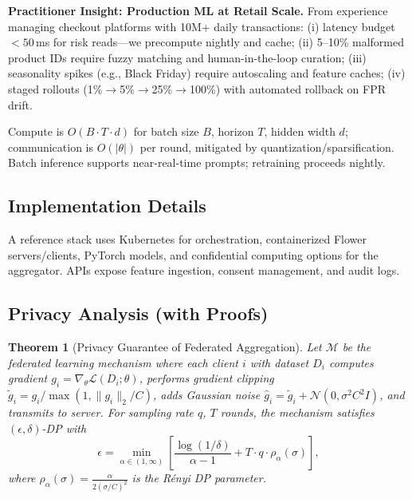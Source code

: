 \documentclass[conference]{IEEEtran}
\theoremstyle{plain}
\newtheorem{theorem}{Theorem}
\theoremstyle{remark}
\begin{document}
\begin{mdframed}
\textbf{Practitioner Insight: Production ML at Retail Scale.} From experience managing checkout platforms with 10M+ daily transactions: (i) latency budget $<50$\,ms for risk reads---we precompute nightly and cache; (ii) 5--10\% malformed product IDs require fuzzy matching and human-in-the-loop curation; (iii) seasonality spikes (e.g., Black Friday) require autoscaling and feature caches; (iv) staged rollouts (1\%$\rightarrow$5\%$\rightarrow$25\%$\rightarrow$100\%) with automated rollback on FPR drift.
\end{mdframed}

Compute is $O(B\cdot T \cdot d)$ for batch size $B$, horizon $T$, hidden width $d$; communication is $O(|\theta|)$ per round, mitigated by quantization/sparsification. Batch inference supports near-real-time prompts; retraining proceeds nightly.

\subsection{Implementation Details}
A reference stack uses Kubernetes for orchestration, containerized Flower servers/clients, PyTorch models, and confidential computing options for the aggregator. APIs expose feature ingestion, consent management, and audit logs.

\subsection{Privacy Analysis (with Proofs)}\label{sec:privacy-analysis}
\begin{theorem}[Privacy Guarantee of Federated Aggregation]\label{thm:dp}
Let $\mathcal{M}$ be the federated learning mechanism where each client $i$ with dataset $D_i$ computes gradient $g_i = \nabla_\theta \mathcal{L}(D_i; \theta)$, performs gradient clipping $\tilde{g}_i = g_i / \max(1, \|g_i\|_2 / C)$, adds Gaussian noise $\hat{g}_i = \tilde{g}_i + \mathcal{N}(0, \sigma^2 C^2 I)$, and transmits to server. For sampling rate $q$, $T$ rounds, the mechanism satisfies $(\epsilon, \delta)$-DP with
\begin{equation*}
\epsilon = \min_{\alpha \in (1,\infty)} \left[ \frac{\log(1/\delta)}{\alpha - 1} + T \cdot q \cdot \rho_\alpha(\sigma) \right],
\end{equation*}
where $\rho_\alpha(\sigma) = \frac{\alpha}{2(\sigma/C)^2}$ is the R\'enyi DP parameter.
\end{theorem}
\end{document}
